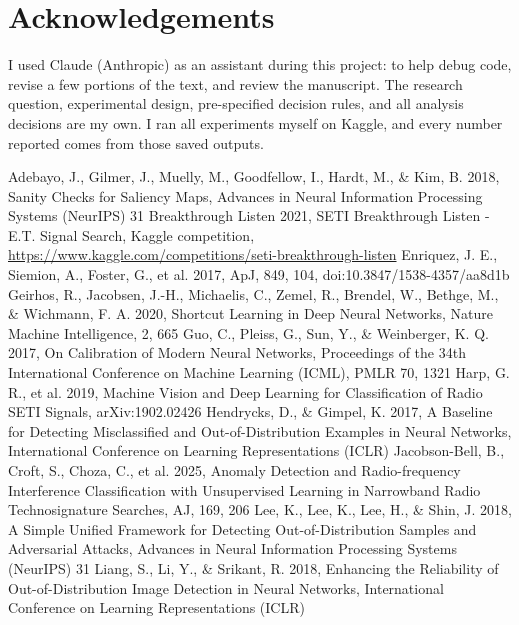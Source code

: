 \documentclass[11pt]{article}
\begin{document}
\section*{Acknowledgements}
I used Claude (Anthropic) as an assistant during this project: to help debug code, revise a few portions of the text, and review the manuscript. The research question, experimental design, pre-specified decision rules, and all analysis decisions are my own. I ran all experiments myself on Kaggle, and every number reported comes from those saved outputs.

\begin{thebibliography}{}
 Adebayo, J., Gilmer, J., Muelly, M., Goodfellow, I., Hardt, M., \& Kim, B. 2018, Sanity Checks for Saliency Maps, Advances in Neural Information Processing Systems (NeurIPS) 31
 Breakthrough Listen 2021, SETI Breakthrough Listen - E.T. Signal Search, Kaggle competition, \url{https://www.kaggle.com/competitions/seti-breakthrough-listen}
 Enriquez, J. E., Siemion, A., Foster, G., et al. 2017, ApJ, 849, 104, doi:10.3847/1538-4357/aa8d1b
 Geirhos, R., Jacobsen, J.-H., Michaelis, C., Zemel, R., Brendel, W., Bethge, M., \& Wichmann, F. A. 2020, Shortcut Learning in Deep Neural Networks, Nature Machine Intelligence, 2, 665
 Guo, C., Pleiss, G., Sun, Y., \& Weinberger, K. Q. 2017, On Calibration of Modern Neural Networks, Proceedings of the 34th International Conference on Machine Learning (ICML), PMLR 70, 1321
 Harp, G. R., et al. 2019, Machine Vision and Deep Learning for Classification of Radio SETI Signals, arXiv:1902.02426
 Hendrycks, D., \& Gimpel, K. 2017, A Baseline for Detecting Misclassified and Out-of-Distribution Examples in Neural Networks, International Conference on Learning Representations (ICLR)
 Jacobson-Bell, B., Croft, S., Choza, C., et al. 2025, Anomaly Detection and Radio-frequency Interference Classification with Unsupervised Learning in Narrowband Radio Technosignature Searches, AJ, 169, 206
 Lee, K., Lee, K., Lee, H., \& Shin, J. 2018, A Simple Unified Framework for Detecting Out-of-Distribution Samples and Adversarial Attacks, Advances in Neural Information Processing Systems (NeurIPS) 31
 Liang, S., Li, Y., \& Srikant, R. 2018, Enhancing the Reliability of Out-of-Distribution Image Detection in Neural Networks, International Conference on Learning Representations (ICLR)

\end{thebibliography}
\end{document}
